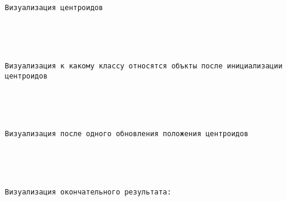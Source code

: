 \documentclass[11pt]{article}
\begin{document}
    \begin{Verbatim}[commandchars=\\\{\}]


Визуализация центроидов
\end{Verbatim}

    \begin{center}
    \end{center}
    { \hspace*{\fill} \\}
    
    \begin{Verbatim}[commandchars=\\\{\}]


Визуализация к какому классу относятся объкты после инициализации центроидов
\end{Verbatim}

    \begin{center}
    \end{center}
    { \hspace*{\fill} \\}
    
    \begin{Verbatim}[commandchars=\\\{\}]


Визуализация после одного обновления положения центроидов
\end{Verbatim}

    \begin{center}
    \end{center}
    { \hspace*{\fill} \\}
    
    \begin{Verbatim}[commandchars=\\\{\}]


Визуализация окончательного результата:
\end{Verbatim}

    \begin{center}
    \end{center}
    { \hspace*{\fill} \\}
    
\end{document}

